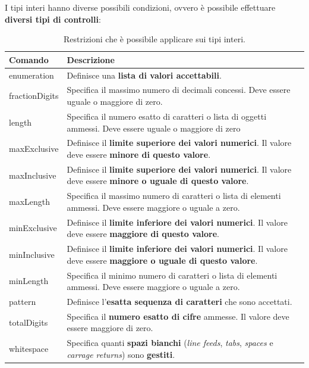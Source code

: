 \documentclass[a4paper]{article}
\begin{document}
	I tipi interi hanno diverse possibili condizioni, ovvero è possibile effettuare \textbf{diversi tipi di controlli}:
	\begin{table}[!htp]
		\centering
		\begin{tabular}{@{} l | p{27em} @{}}
			\toprule
			Comando	& Descrizione \\
			\midrule
			\textsf{enumeration}	& Definisce una \textbf{lista di valori accettabili}. \\ [0.5em]
			\textsf{fractionDigits}	& Specifica il massimo numero di decimali concessi. Deve essere uguale o maggiore di zero. \\ [0.5em]
			\textsf{length}			& Specifica il numero esatto di caratteri o lista di oggetti ammessi. Deve essere uguale o maggiore di zero \\ [0.5em]
			\textsf{maxExclusive}	& Definisce il \textbf{limite superiore dei valori numerici}. Il valore deve essere \textbf{minore di questo valore}. \\ [0.5em]
			\textsf{maxInclusive}	& Definisce il \textbf{limite superiore dei valori numerici}. Il valore deve essere \textbf{minore o uguale di questo valore}. \\ [0.5em]
			\textsf{maxLength}		& Specifica il massimo numero di caratteri o lista di elementi ammessi. Deve essere maggiore o uguale a zero. \\ [0.5em]
			\textsf{minExclusive}	& Definisce il \textbf{limite inferiore dei valori numerici}. Il valore deve essere \textbf{maggiore di questo valore}. \\ [0.5em]
			\textsf{minInclusive}	& Definisce il \textbf{limite inferiore dei valori numerici}. Il valore deve essere \textbf{maggiore o uguale di questo valore}. \\ [0.5em]
			\textsf{minLength}		& Specifica il minimo numero di caratteri o lista di elementi ammessi. Deve essere maggiore o uguale a zero. \\ [0.5em]
			\textsf{pattern}		& Definisce l'\textbf{esatta sequenza di caratteri} che sono accettati. \\ [0.5em]
			\textsf{totalDigits}	& Specifica il \textbf{numero esatto di cifre} ammesse. Il valore deve essere maggiore di zero. \\ [0.5em]
			\textsf{whitespace}		& Specifica quanti \textbf{spazi bianchi} (\emph{line feeds}, \emph{tabs}, \emph{spaces} e \emph{carrage returns}) sono \textbf{gestiti}. \\
			\bottomrule
		\end{tabular}
		\caption{Restrizioni che è possibile applicare sui tipi interi.}
	\end{table}
	
\end{document}
